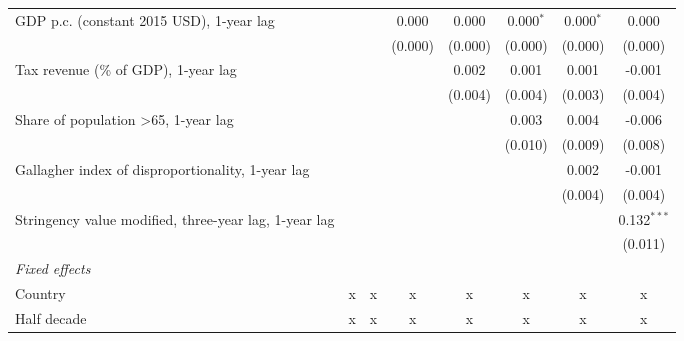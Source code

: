 \begin{table}[htbp]
\begin{tabular}{lccccccc}
      GDP p.c. (constant 2015 USD), 1-year lag                               &               &               & 0.000         & 0.000         & 0.000$^{*}$   & 0.000$^{*}$   & 0.000\\   
                                                                             &               &               & (0.000)       & (0.000)       & (0.000)       & (0.000)       & (0.000)\\   
      Tax revenue (\% of GDP), 1-year lag                                    &               &               &               & 0.002         & 0.001         & 0.001         & -0.001\\   
                                                                             &               &               &               & (0.004)       & (0.004)       & (0.003)       & (0.004)\\   
      Share of population >65, 1-year lag                                    &               &               &               &               & 0.003         & 0.004         & -0.006\\   
                                                                             &               &               &               &               & (0.010)       & (0.009)       & (0.008)\\   
      Gallagher index of disproportionality, 1-year lag                      &               &               &               &               &               & 0.002         & -0.001\\   
                                                                             &               &               &               &               &               & (0.004)       & (0.004)\\   
      Stringency value modified, three-year lag, 1-year lag                  &               &               &               &               &               &               & 0.132$^{***}$\\   
                                                                             &               &               &               &               &               &               & (0.011)\\   
      \emph{Fixed effects}\\
      Country                                                                & x             & x             & x             & x             & x             & x             & x\\  
      Half decade                                                            & x             & x             & x             & x             & x             & x             & x\\  

\end{tabular}
\end{table}
